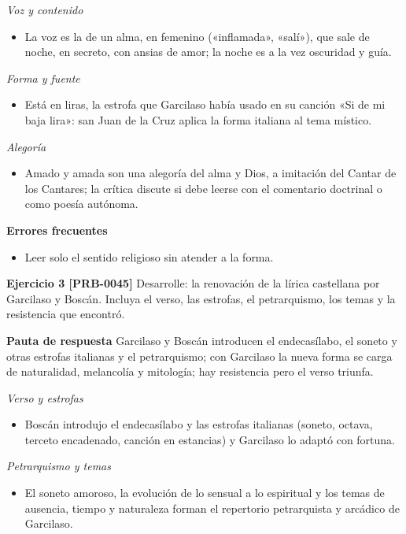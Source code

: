 \documentclass{book}
\begin{document}
\noindent\textit{Voz y contenido}
\begin{itemize}
\item La voz es la de un alma, en femenino («inflamada», «salí»), que sale de noche, en secreto, con ansias de amor; la noche es a la vez oscuridad y guía.
\end{itemize}

\noindent\textit{Forma y fuente}
\begin{itemize}
\item Está en liras, la estrofa que Garcilaso había usado en su canción «Si de mi baja lira»: san Juan de la Cruz aplica la forma italiana al tema místico.
\end{itemize}

\noindent\textit{Alegoría}
\begin{itemize}
\item Amado y amada son una alegoría del alma y Dios, a imitación del Cantar de los Cantares; la crítica discute si debe leerse con el comentario doctrinal o como poesía autónoma.
\end{itemize}

\noindent\textbf{Errores frecuentes}
\begin{itemize}
\item Leer solo el sentido religioso sin atender a la forma.
\end{itemize}

\noindent\textbf{Ejercicio 3 [PRB-0045]}
Desarrolle: la renovación de la lírica castellana por Garcilaso y Boscán. Incluya el verso, las estrofas, el petrarquismo, los temas y la resistencia que encontró.


\noindent\textbf{Pauta de respuesta}
Garcilaso y Boscán introducen el endecasílabo, el soneto y otras estrofas italianas y el petrarquismo; con Garcilaso la nueva forma se carga de naturalidad, melancolía y mitología; hay resistencia pero el verso triunfa.


\noindent\textit{Verso y estrofas}
\begin{itemize}
\item Boscán introdujo el endecasílabo y las estrofas italianas (soneto, octava, terceto encadenado, canción en estancias) y Garcilaso lo adaptó con fortuna.
\end{itemize}

\noindent\textit{Petrarquismo y temas}
\begin{itemize}
\item El soneto amoroso, la evolución de lo sensual a lo espiritual y los temas de ausencia, tiempo y naturaleza forman el repertorio petrarquista y arcádico de Garcilaso.
\end{itemize}
\end{document}
